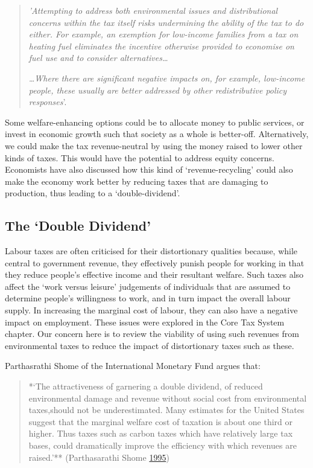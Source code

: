 \documentclass[]{tufte-handout}
\begin{document}
\begin{quote}
\emph{'Attempting to address both environmental issues and
distributional concerns within the tax itself risks undermining the
ability of the tax to do either. For example, an exemption for
low-income families from a tax on heating fuel eliminates the incentive
otherwise provided to economise on fuel use and to consider
alternatives\ldots{}}

\emph{\ldots{}Where there are significant negative impacts on, for
example, low-income people, these usually are better addressed by other
redistributive policy responses}'.
\end{quote}

Some welfare-enhancing options could be to allocate money to public
services, or invest in economic growth such that society as a whole is
better-off. Alternatively, we could make the tax revenue-neutral by
using the money raised to lower other kinds of taxes. This would have
the potential to address equity concerns. Economists have also discussed
how this kind of `revenue-recycling' could also make the economy work
better by reducing taxes that are damaging to production, thus leading
to a `double-dividend'.

\hypertarget{the-double-dividend}{%
\subsection{The `Double Dividend'}\label{the-double-dividend}}

Labour taxes are often criticised for their distortionary qualities
because, while central to government revenue, they effectively punish
people for working in that they reduce people's effective income and
their resultant welfare. Such taxes also affect the `work versus
leisure' judgements of individuals that are assumed to determine
people's willingness to work, and in turn impact the overall labour
supply. In increasing the marginal cost of labour, they can also have a
negative impact on employment. These issues were explored in the Core
Tax System chapter. Our concern here is to review the viability of using
such revenues from environmental taxes to reduce the impact of
distortionary taxes such as these.

Parthasrathi Shome of the International Monetary Fund argues that:

\begin{quote}
*`The attractiveness of garnering a double dividend, of reduced
environmental damage and revenue without social cost from environmental
taxes,should not be underestimated. Many estimates for the United States
suggest that the marginal welfare cost of taxation is about one third or
higher. Thus taxes such as carbon taxes which have relatively large tax
bases, could dramatically improve the efficiency with which revenues are
raised.'** (Parthasarathi Shome
\protect\hyperlink{ref-ParthasarathiShome}{1995})
\end{quote}
\end{document}
